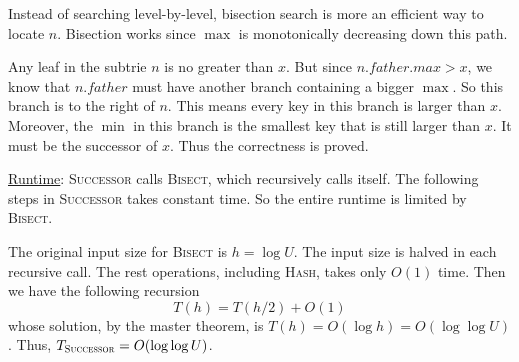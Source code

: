 \documentclass{article}
\begin{document}
Instead of searching level-by-level, bisection search is more an efficient way to locate $n$. Bisection works since $\max$ is monotonically decreasing down this path.

Any leaf in the subtrie $n$ is no greater than $x$. But since $n.father.max>x$, we know that $n.father$ must have another branch containing a bigger $\max$. So this branch is to the right of $n$. This means every key in this branch is larger than $x$. Moreover, the $\min$ in this branch is the smallest key that is still larger than $x$. It must be the successor of $x$. Thus the correctness is proved. 

\noindent\underline{Runtime}: \textsc{Successor} calls \textsc{Bisect}, which recursively calls itself. The following steps in \textsc{Successor} takes constant time. So the entire runtime is limited by \textsc{Bisect}.

The original input size for \textsc{Bisect} is $h=\log U$. The input size is halved in each recursive call. The rest operations, including \textsc{Hash}, takes only $O(1)$ time. Then we have the following recursion
\begin{equation*}
T(h)=T(h/2)+O(1)
\end{equation*}
whose solution, by the master theorem, is $T(h)=O(\log h)=O(\log\log U)$. Thus, $T_{\textsc{Successor}}=O(\log\log U)$.
\end{document}
